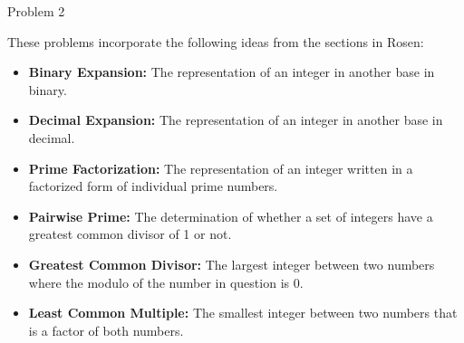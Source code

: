 \begin{problem}{Problem 2}
\begin{highlight}[Solution]
        These problems incorporate the following ideas from the sections in Rosen:

        \begin{itemize}
            \item \textbf{Binary Expansion:} The representation of an integer in another base in binary.
            \item \textbf{Decimal Expansion:} The representation of an integer in another base in decimal.
            \item \textbf{Prime Factorization:} The representation of an integer written in a factorized form of individual prime numbers.
            \item \textbf{Pairwise Prime:} The determination of whether a set of integers have a greatest common divisor of 1 or not.
            \item \textbf{Greatest Common Divisor:} The largest integer between two numbers where the modulo of the number in question is 0.
            \item \textbf{Least Common Multiple:} The smallest integer between two numbers that is a factor of both numbers.
        \end{itemize}
    \end{highlight}
\end{problem}


